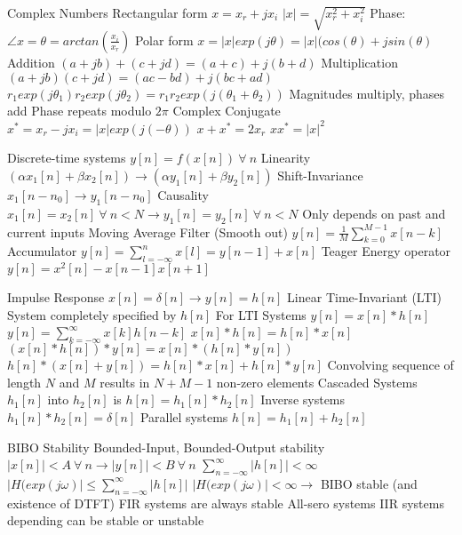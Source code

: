\documentclass[14pt]{extarticle}
\begin{document}
\begin{outline}
		\1	Complex Numbers
			\2	Rectangular form
				\3	$x = x_r + jx_i$
				\3	$|x| = \sqrt{x_r^2 + x_i^2}$
				\3	Phase: $\angle x = \theta = arctan(\frac{x_i}{x_r})$
			\2	Polar form
				\3	$x = |x|exp(j\theta) = |x|(cos(\theta) + jsin(\theta)$	
			\2	Addition
				\3	$(a + jb) + (c + jd) = (a + c) + j(b + d)$
			\2	Multiplication
				\3	$(a + jb)(c + jd) = (ac - bd) + j(bc + ad)$
				\3	$r_1exp(j\theta_1)r_2exp(j\theta_2) = r_1r_2exp(j(\theta_1 + \theta_2))$
				\3	Magnitudes multiply, phases add
				\3	Phase repeats modulo $2\pi$
			\2	Complex Conjugate
				\3	$x^* = x_r - jx_i = |x|exp(j(-\theta))$
				\3	$x + x^* = 2x_r$
				\3	$xx^* = |x|^2$
			
		\1	Discrete-time systems
			\2	$y[n] = f(x[n])~\forall~n$
			\2	Linearity
				\3	$(\alpha x_1[n] + \beta x_2[n]) \rightarrow (\alpha y_1[n] + \beta y_2[n])$
			\2	Shift-Invariance
				\3	$x_1[n-n_0] \rightarrow y_1[n-n_0]$
			\2	Causality
				\3	$x_1[n] = x_2[n]~\forall~n < N \rightarrow y_1[n] = y_2[n]~\forall~n < N$
				\3	Only depends on past and current inputs
			\2	Moving Average Filter (Smooth out)
				\3	$y[n] = \frac{1}{M} \sum_{k=0}^{M-1}x[n-k]$
			\2	Accumulator
				\3	$y[n] = \sum_{l = -\infty}^nx[l] = y[n-1] + x[n]$
			\2	Teager Energy operator
				\3	$y[n] = x^2[n] - x[n-1]x[n+1]$
		
		\1	Impulse Response
			\2	$x[n] = \delta[n] \rightarrow y[n] = h[n]$
			\2	Linear Time-Invariant (LTI) System completely specified by $h[n]$
			\2	For LTI Systems $y[n] = x[n] * h[n]$
				\3	$y[n] = \sum_{k = -\infty}^{\infty} x[k]h[n-k]$
				\3	$x[n] * h[n] = h[n] * x[n]$
				\3	$(x[n]*h[n])*y[n] = x[n]*(h[n]*y[n])$
				\3	$h[n]*(x[n] + y[n]) = h[n]*x[n] + h[n]*y[n]$
				\3	Convolving sequence of length $N$ and $M$ results in $N + M - 1$ non-zero elements
			\2	Cascaded Systems
				\3	$h_1[n]$ into $h_2[n]$ is $h[n] = h_1[n] * h_2[n]$
			\2	Inverse systems
				\3	$h_1[n] * h_2[n] = \delta[n]$
			\2	Parallel systems
				\3	$h[n] = h_1[n] + h_2[n]$
		
		\1	BIBO Stability
			\2	Bounded-Input, Bounded-Output stability
			\2	$|x[n]| < A~\forall~n \rightarrow |y[n]| < B~\forall~n$
			\2	$\sum_{n=-\infty}^{\infty} |h[n]| < \infty$
			\2	$|H(exp(j\omega)| \le \sum_{n=-\infty}^{\infty} |h[n]|$
			\2	$|H(exp(j\omega)| < \infty \rightarrow$ BIBO stable (and existence of DTFT)
			\2	FIR systems are always stable
				\3	All-sero systems
			\2	IIR systems depending can be stable or unstable


\end{outline}
\end{document}

